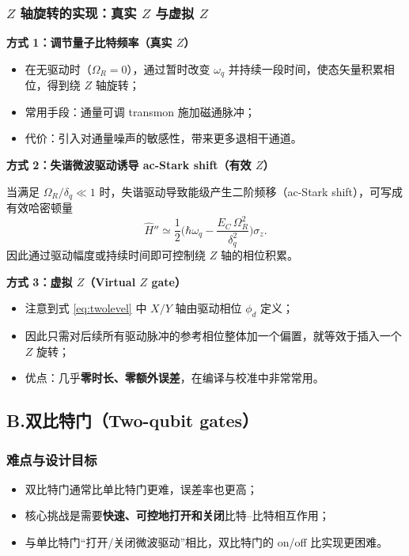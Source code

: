 \documentclass[12pt,a4paper,oneside]{ctexbook}
\begin{document}
\subsubsection{$Z$ 轴旋转的实现：真实 $Z$ 与虚拟 $Z$}

\noindent\textbf{方式 1：调节量子比特频率（真实 $Z$）}

\begin{itemize}
  \item 在无驱动时（$\Omega_R=0$），通过暂时改变 $\omega_q$ 并持续一段时间，使态矢量积累相位，得到绕 $Z$ 轴旋转；
  \item 常用手段：通量可调 transmon 施加磁通脉冲；
  \item 代价：引入对通量噪声的敏感性，带来更多退相干通道。
\end{itemize}

\noindent\textbf{方式 2：失谐微波驱动诱导 ac-Stark shift（有效 $Z$）}

当满足 $\Omega_R/\delta_q \ll 1$ 时，失谐驱动导致能级产生二阶频移（ac-Stark shift），可写成有效哈密顿量
\begin{equation}
  \hat H'' \simeq \frac{1}{2}\Big(\hbar\omega_q-\frac{E_C\,\Omega_R^2}{\delta_q^2}\Big)\sigma_z.
  \label{eq:acstark}
\end{equation}
因此通过驱动幅度或持续时间即可控制绕 $Z$ 轴的相位积累。

\noindent\textbf{方式 3：虚拟 $Z$（Virtual $Z$ gate）}

\begin{itemize}
  \item 注意到式 \eqref{eq:twolevel} 中 $X/Y$ 轴由驱动相位 $\phi_d$ 定义；
  \item 因此只需对后续所有驱动脉冲的参考相位整体加一个偏置，就等效于插入一个 $Z$ 旋转；
  \item 优点：几乎\textbf{零时长、零额外误差}，在编译与校准中非常常用。
\end{itemize}

\subsection{B.\quad 双比特门（Two-qubit gates）}

\subsubsection{难点与设计目标}

\begin{itemize}
  \item 双比特门通常比单比特门更难，误差率也更高；
  \item 核心挑战是需要\textbf{快速、可控地打开和关闭}比特--比特相互作用；
  \item 与单比特门“打开/关闭微波驱动”相比，双比特门的 on/off 比实现更困难。
\end{itemize}
\end{document}
